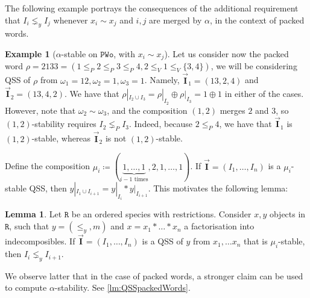 \documentclass[12pt, reqno]{amsart}
\theoremstyle{definition}
\newtheorem{lm}[thm]{Lemma}
\newtheorem{smpl}[thm]{Example}
\newcommand{\III}{\vec{\mathbf{I}}}
\begin{document}
The following example portrays the consequences of the additional requirement that $I_i \lneq_y I_j$ whenever $x_i \sim x_j$ and $i, j$ are merged by $\alpha$, in the context of packed words.

\begin{smpl}[$\alpha$-stable on $\mathtt{PWo}$, with $x_i \sim x_j$]
Let us consider now the packed word $\rho = 2133 = (1 \leq_P 2 \leq_P 3 \leq_P 4, 2 \leq_V 1 \leq_V \{3, 4\} )$, we will be considering QSS of $\rho$ from $\omega_1 = 12, \omega_2 = 1, \omega_3 = 1$.
Namely, $\III_1 = (13, 2, 4)$ and $\III_2 = (13, 4, 2)$.
We have that $\rho|_{I_2 \cup I_3} = \rho|_{I_2} \oplus \rho|_{I_3} = 1 \oplus 1$ in either of the cases.
However, note that $\omega_2 \sim \omega_3$, and the composition $(1, 2)$ merges $2$ and $3$, so $(1, 2)$-stability requires $I_2 \lneq_P I_3$.
Indeed, because $2 \leq_P 4$, we have that $\III_1$ is $(1, 2)$-stable, whereas $\III_2$ is not $(1, 2)$-stable.
\end{smpl}


Define the composition $\mu_i \coloneqq (\underbrace{1, \dots , 1}_\text{$i-1$ times}, 2, 1, \dots, 1)$.
If $\III = (I_1, \dots, I_n)$  is a $\mu_i$-stable QSS, then $y|_{I_1 \cup I_{i+1}} = y|_{I_i} \ast y|_{I_{i+1}}$.
This motivates the following lemma:

\begin{lm}\label{obs:pwords-characterisation}
Let $\mathtt{R}$ be an ordered species with restrictions.
Consider $x, y$ objects in $\mathtt{R}$, such that $y = (\leq_y, m)$ and $x = x_1\ast \dots \ast x_n$ a factorisation into indecomposibles.
If $\III = (I_1, \dots, I_n)$ is a QSS of $y$ from $x_1, \dots x_n$ that is $\mu_i$-stable, then $I_i \lneq_y I_{i+1}$.
\end{lm}


We observe latter that in the case of packed words, a stronger claim can be used to compute $\alpha$-stability.
See \cref{lm:QSSpackedWords}.
\end{document}
